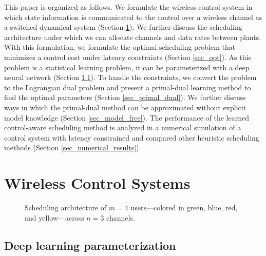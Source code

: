 \documentclass[conference,10pt]{IEEEtran}
\begin{document}
This paper is organized as follows. We formulate the wireless control system in which state information is communicated to the control over a wireless channel as a switched dynamical system (Section \ref{sec_problem}). We further discuss the scheduling architecture under which we can allocate channels and data rates between plants. With this formulation, we formulate the optimal scheduling problem that minimizes a control cost under latency constraints (Section \ref{sec_opt}). As this problem is a statistical learning problem, it can be parameterized with a deep neural network (Section \ref{sec_param}). To handle the constraints, we convert the problem to the Lagrangian dual problem and present a primal-dual learning method to find the optimal parameters (Section \ref{sec_primal_dual}). We further discuss ways in which the primal-dual method can be approximated without explicit model knowledge (Section \ref{sec_model_free}). The performance of the learned control-aware scheduling method is analyzed in a numerical simulation of a control system with latency constrained and compared other heuristic scheduling methods (Section \ref{sec_numerical_results}). 



%

\section{Wireless Control Systems}\label{sec_problem}

%
\begin{figure}
\centering

\caption{Scheduling architecture of $m=4$ users---colored in green, blue, red, and yellow---across $n=3$ channels.}
\label{fig_multi}
\end{figure}
%



\subsection{Deep learning parameterization}\label{sec_param}
\end{document}
